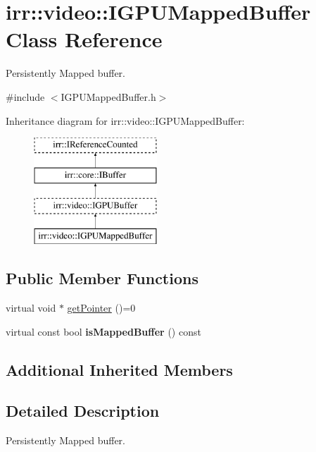 \hypertarget{classirr_1_1video_1_1IGPUMappedBuffer}{}\section{irr\+:\+:video\+:\+:I\+G\+P\+U\+Mapped\+Buffer Class Reference}
\label{classirr_1_1video_1_1IGPUMappedBuffer}


Persistently Mapped buffer.  




{\ttfamily \#include $<$I\+G\+P\+U\+Mapped\+Buffer.\+h$>$}

Inheritance diagram for irr\+:\+:video\+:\+:I\+G\+P\+U\+Mapped\+Buffer\+:\begin{figure}[H]
\begin{center}
\leavevmode
\includegraphics[height=4.000000cm]{classirr_1_1video_1_1IGPUMappedBuffer}
\end{center}
\end{figure}
\subsection*{Public Member Functions}
\begin{DoxyCompactItemize}
\item 
virtual void $\ast$ \hyperlink{classirr_1_1video_1_1IGPUMappedBuffer_aa51f531fc87e800e10c9f8b91357f1be}{get\+Pointer} ()=0
\item 
virtual const bool {\bfseries is\+Mapped\+Buffer} () const \hypertarget{classirr_1_1video_1_1IGPUMappedBuffer_a00793692ef2756b07854664c7e8e6780}{}\label{classirr_1_1video_1_1IGPUMappedBuffer_a00793692ef2756b07854664c7e8e6780}

\end{DoxyCompactItemize}
\subsection*{Additional Inherited Members}


\subsection{Detailed Description}
Persistently Mapped buffer. 


